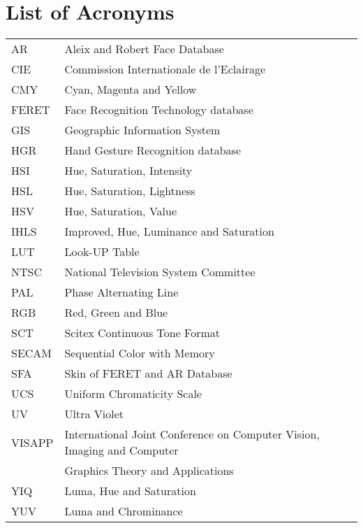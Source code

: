 \documentclass[12pt,twoside,a4paper]{book}
\theoremstyle{plain}
\theoremstyle{definition}
\begin{document}
\chapter{List of Acronyms}
\begin{tabular}{ll}
    AR          & Aleix and Robert Face Database\\
    CIE         & Commission Internationale de l'Eclairage\\
    CMY         & Cyan, Magenta and Yellow\\
    FERET       & Face Recognition Technology database\\
    GIS         & Geographic Information System\\
    HGR         & Hand Gesture Recognition database\\
    HSI         & Hue, Saturation, Intensity\\
    HSL         & Hue, Saturation, Lightness\\
    HSV         & Hue, Saturation, Value\\
    IHLS        & Improved, Hue, Luminance and Saturation\\
    LUT         & Look-UP Table\\
    NTSC        & National Television System Committee\\
    PAL         & Phase Alternating Line\\
    RGB         & Red, Green and Blue\\
    SCT         & Scitex Continuous Tone Format\\
    SECAM       & Sequential Color with Memory\\
    SFA         & Skin of FERET and AR Database\\
    UCS         & Uniform Chromaticity Scale\\
    UV          & Ultra Violet\\
    VISAPP      & International Joint Conference on Computer Vision, Imaging and Computer\\
                & Graphics Theory and Applications\\
    YIQ         & Luma, Hue and Saturation\\
    YUV         & Luma and Chrominance\\
\end{tabular}

\end{document}
